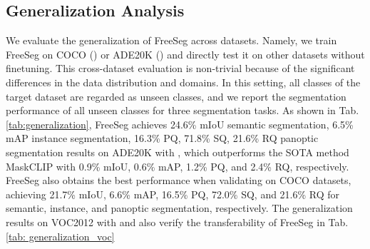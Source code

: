 \documentclass[10pt,twocolumn,letterpaper]{article}
\begin{document}
\begin{table}[tp]
    \centering
    \small
      \vspace{-8pt}
    \caption{Generalization performance (in\%)  of the open vocabulary semantic segmentation on VOC2012 datasets.}
      \vspace{-8pt}
    \begin{threeparttable}
        \end{threeparttable}
        \label{tab: generalization_voc}
\end{table}  




\subsection{Generalization Analysis}
We evaluate the generalization of FreeSeg across datasets. Namely, we train FreeSeg on COCO () or ADE20K () and directly test it on other datasets without finetuning.
This cross-dataset evaluation is non-trivial because of the significant differences in the data distribution and domains. 
In this setting, all classes of the target dataset are regarded as unseen classes, and we report the segmentation performance of all unseen classes for three segmentation tasks.
As shown in Tab. \ref{tab:generalization}, FreeSeg achieves 24.6\% mIoU semantic segmentation, 6.5\% mAP instance segmentation, 16.3\% PQ, 71.8\% SQ, 21.6\% RQ panoptic segmentation results on ADE20K with , which outperforms the SOTA method MaskCLIP\cite{ding2022open} with 0.9\% mIoU, 0.6\% mAP, 1.2\% PQ, and 2.4\% RQ, respectively. 
FreeSeg also obtains the best performance when validating  on COCO  datasets, achieving 21.7\% mIoU, 6.6\% mAP, 16.5\% PQ, 72.0\% SQ, and 21.6\% RQ for semantic, instance, and panoptic segmentation, respectively. 
The generalization results on VOC2012  with   and  also verify the transferability of FreeSeg in Tab.\ref{tab: generalization_voc}
\end{document}
